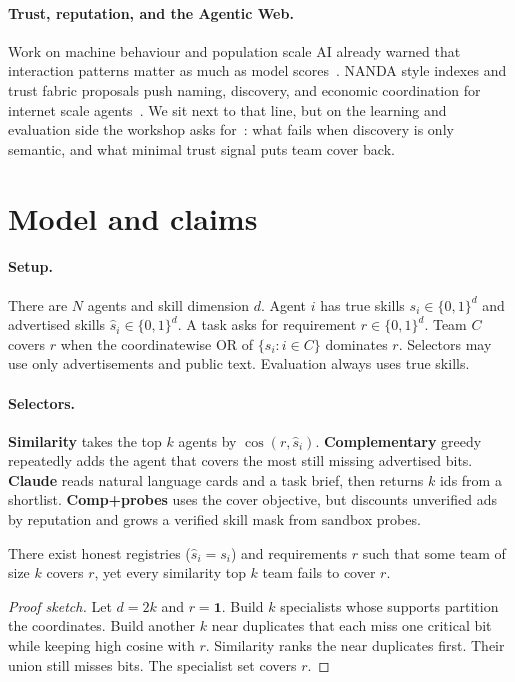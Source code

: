 \documentclass{article}
\begin{document}
\paragraph{Trust, reputation, and the Agentic Web.}
Work on machine behaviour and population scale AI already warned that interaction patterns matter as much as model scores~\citep{rahwan2019}.
NANDA style indexes and trust fabric proposals push naming, discovery, and economic coordination for internet scale agents~\citep{raskar2025,balija2025}.
We sit next to that line, but on the learning and evaluation side the workshop asks for~\citep{projectnanda2026}: what fails when discovery is only semantic, and what minimal trust signal puts team cover back.

\section{Model and claims}

\paragraph{Setup.}
There are $N$ agents and skill dimension $d$.
Agent $i$ has true skills $s_i \in \{0,1\}^d$ and advertised skills $\hat s_i \in \{0,1\}^d$.
A task asks for requirement $r \in \{0,1\}^d$.
Team $C$ covers $r$ when the coordinatewise OR of $\{s_i:i\in C\}$ dominates $r$.
Selectors may use only advertisements and public text.
Evaluation always uses true skills.

\paragraph{Selectors.}
\textbf{Similarity} takes the top $k$ agents by $\cos(r,\hat s_i)$.
\textbf{Complementary} greedy repeatedly adds the agent that covers the most still missing advertised bits.
\textbf{Claude} reads natural language cards and a task brief, then returns $k$ ids from a shortlist.
\textbf{Comp+probes} uses the cover objective, but discounts unverified ads by reputation and grows a verified skill mask from sandbox probes.

\begin{proposition}
There exist honest registries ($\hat s_i=s_i$) and requirements $r$ such that some team of size $k$ covers $r$, yet every similarity top $k$ team fails to cover $r$.
\end{proposition}

\begin{proof}[Proof sketch]
Let $d=2k$ and $r=\mathbf{1}$.
Build $k$ specialists whose supports partition the coordinates.
Build another $k$ near duplicates that each miss one critical bit while keeping high cosine with $r$.
Similarity ranks the near duplicates first.
Their union still misses bits.
The specialist set covers $r$.
\end{proof}
\end{document}
